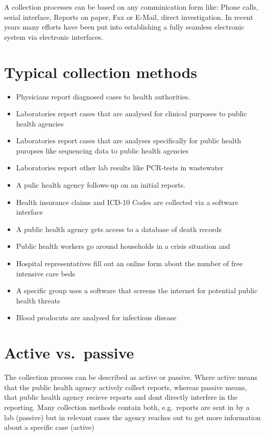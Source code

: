 \documentclass[
  letterpaper,
  DIV=11,
  numbers=noendperiod]{scrreprt}
\providecommand{\tightlist}{%
  \setlength{\itemsep}{0pt}\setlength{\parskip}{0pt}}\usepackage{longtable,booktabs,array}
\begin{document}
A collection processes can be based on any comminication form like:
Phone calls, serial interface, Reports on paper, Fax or E-Mail, direct
investigation. In recent years many efforts have been put into
establishing a fully seamless electronic system via electronic
interfaces.

\section{Typical collection methods}\label{typical-collection-methods}

\begin{itemize}
\tightlist
\item
  Physicians report diagnosed cases to health authorities.
\item
  Laboratories report cases that are analysed for clinical purposes to
  public health agencies
\item
  Laboratories report cases that are analyses specifically for public
  health puropses like sequencing data to public health agencies
\item
  Laboratories report other lab results like PCR-tests in wastewater
\item
  A pulic health agency follows-up on an initial reports.
\item
  Health insurance claims and ICD-10 Codes are collected via a software
  interface
\item
  A public health agency gets access to a database of death records
\item
  Public health workers go around households in a crisis situation and
\item
  Hospital representatives fill out an online form about the number of
  free intensive care beds
\item
  A specific group uses a software that screens the internet for
  potential public health threats
\item
  Blood prodocuts are analysed for infectious disease
\end{itemize}

\section{Active vs.~passive}\label{active-vs.-passive}

The collection process can be described as active or passive. Where
active means that the public health agency actively collect reports,
whereas passive means, that public health agency recieve reports and
dont directly interfere in the reporting. Many collection methods
contain both, e.g.~reports are sent in by a lab (passive) but in
relevant cases the agency reaches out to get more information about a
specific case (active)
\end{document}
